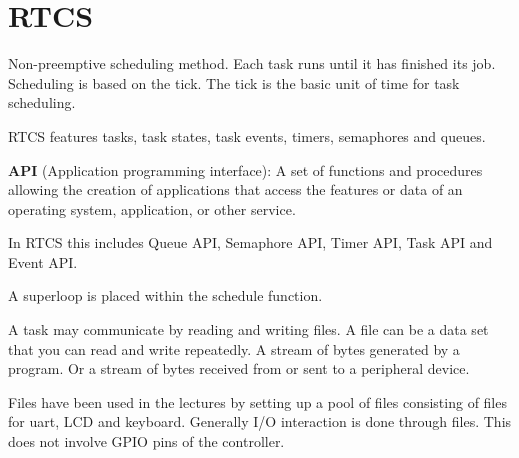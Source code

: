 \section{RTCS}


Non-preemptive scheduling method.
Each task runs until it has finished its job.
Scheduling is based on the tick. The tick is the basic
unit of time for task scheduling.

RTCS features tasks, task states, task events, timers, semaphores and queues.

\textbf{API} (Application programming interface): A set of functions and procedures
allowing the creation of applications that access the features or data of
an operating system, application, or other service.

In RTCS this includes Queue API, Semaphore API, Timer API, Task API and Event API.

A superloop is placed within the schedule function.

A task may communicate by reading and writing files. A file can be
a data set that you can read and write repeatedly. A stream of bytes
generated by a program. Or a stream of bytes received from or sent to
a peripheral device.

Files have been used in the lectures by setting up a pool of files
consisting of files for uart, LCD and keyboard. Generally
I/O interaction is done through files. This does not involve
GPIO pins of the controller.

